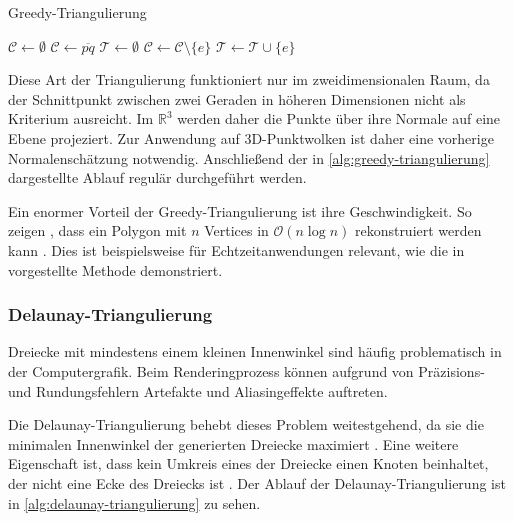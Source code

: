 \begin{algorithm}
\caption{Greedy-Triangulierung}
\label{alg:greedy-triangulierung}
\begin{algorithmic}
\State $\mathcal{C} \gets \emptyset$
	\State $\mathcal{C} \gets \overline{pq}$
\EndFor
\State {}
\State $\mathcal{T} \gets \emptyset$
			\State $\mathcal{C} \gets \mathcal{C} \setminus \{e\}$
		\EndIf
	\EndFor
	\State $\mathcal{T} \gets \mathcal{T} \cup \{e\}$
\EndFor
\State {}
\end{algorithmic}
\end{algorithm}

Diese Art der Triangulierung funktioniert nur im zweidimensionalen Raum, da der Schnittpunkt zwischen zwei Geraden in höheren Dimensionen nicht als Kriterium ausreicht.
Im $\mathbb{R}^3$ werden daher die Punkte über ihre Normale auf eine Ebene projeziert.
Zur Anwendung auf 3D-Punktwolken ist daher eine vorherige Normalenschätzung notwendig.
Anschließend der in \autoref{alg:greedy-triangulierung} dargestellte Ablauf regulär durchgeführt werden.

Ein enormer Vorteil der Greedy-Triangulierung ist ihre Geschwindigkeit.
So zeigen \citeauthor{berg2000comp}, dass ein Polygon mit $n$ Vertices in $\mathcal{O}(n \log n)$ rekonstruiert werden kann \cite[56--58]{berg2000comp}.
Dies ist beispielsweise für Echtzeitanwendungen relevant, wie die in \cite{Marton09ICRA} vorgestellte Methode demonstriert.


\subsubsection{Delaunay-Triangulierung}
\label{subsubsec:delaunay-triangulierung}

Dreiecke mit mindestens einem kleinen Innenwinkel sind häufig problematisch in der Computergrafik.
Beim Renderingprozess können aufgrund von Präzisions- und Rundungsfehlern Artefakte und Aliasingeffekte auftreten.

Die Delaunay-Triangulierung behebt dieses Problem weitestgehend, da sie die minimalen Innenwinkel der generierten Dreiecke maximiert \cite[199]{berg2000comp}.
Eine weitere Eigenschaft ist, dass kein Umkreis eines der Dreiecke einen Knoten beinhaltet, der nicht eine Ecke des Dreiecks ist \cite[196]{berg2000comp}. Der Ablauf der Delaunay-Triangulierung ist in \autoref{alg:delaunay-triangulierung} zu sehen.

